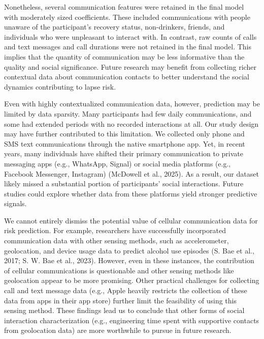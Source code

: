 \documentclass[
  letterpaper,
  DIV=11,
  numbers=noendperiod]{scrartcl}
\begin{document}
Nonetheless, several communication features were retained in the final
model with moderately sized coefficients. These included communications
with people unaware of the participant's recovery status, non-drinkers,
friends, and individuals who were unpleasant to interact with. In
contrast, raw counts of calls and text messages and call durations were
not retained in the final model. This implies that the quantity of
communication may be less informative than the quality and social
significance. Future research may benefit from collecting richer
contextual data about communication contacts to better understand the
social dynamics contributing to lapse risk.

Even with highly contextualized communication data, however, prediction
may be limited by data sparsity. Many participants had few daily
communications, and some had extended periods with no recorded
interactions at all. Our study design may have further contributed to
this limitation. We collected only phone and SMS text communications
through the native smartphone app. Yet, in recent years, many
individuals have shifted their primary communication to private
messaging apps (e.g., WhatsApp, Signal) or social media platforms (e.g.,
Facebook Messenger, Instagram) (McDowell et al., 2025). As a result, our
dataset likely missed a substantial portion of participants' social
interactions. Future studies could explore whether data from these
platforms yield stronger predictive signals.

We cannot entirely dismiss the potential value of cellular communication
data for risk prediction. For example, researchers have successfully
incorporated communication data with other sensing methods, such as
accelerometer, geolocation, and device usage data to predict alcohol use
episodes (S. Bae et al., 2017; S. W. Bae et al., 2023). However, even in
these instances, the contribution of cellular communications is
questionable and other sensing methods like geolocation appear to be
more promising. Other practical challenges for collecting call and text
message data (e.g., Apple heavily restricts the collection of these data
from apps in their app store) further limit the feasibility of using
this sensing method. These findings lead us to conclude that other forms
of social interaction characterization (e.g., engineering time spent
with supportive contacts from geolocation data) are more worthwhile to
pursue in future research.

\newpage
\end{document}
